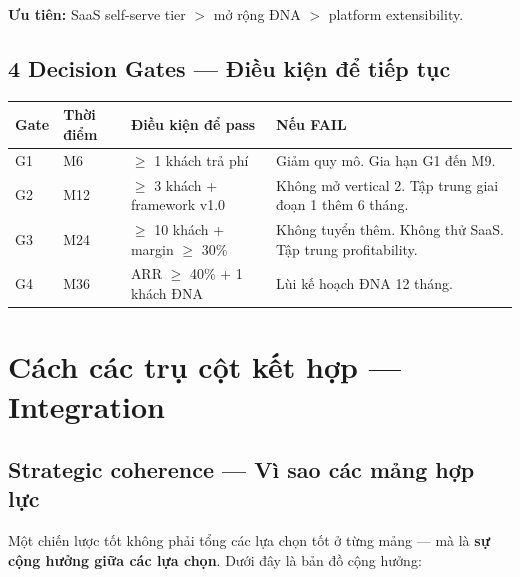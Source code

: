 \documentclass[11pt,a4paper]{article}
\begin{document}
\textbf{Ưu tiên:} SaaS self-serve tier $>$ mở rộng ĐNA $>$ platform extensibility.

\subsection{4 Decision Gates --- Điều kiện để tiếp tục}

\begin{tabularx}{\linewidth}{@{}p{1cm} p{2cm} X X@{}}
\toprule
\textbf{Gate} & \textbf{Thời điểm} & \textbf{Điều kiện để pass} & \textbf{Nếu FAIL} \\
\midrule
G1 & M6 & $\geq$ 1 khách trả phí & Giảm quy mô. Gia hạn G1 đến M9. \\
G2 & M12 & $\geq$ 3 khách + framework v1.0 & Không mở vertical 2. Tập trung giai đoạn 1 thêm 6 tháng. \\
G3 & M24 & $\geq$ 10 khách + margin $\geq$ 30\% & Không tuyển thêm. Không thử SaaS. Tập trung profitability. \\
G4 & M36 & ARR $\geq$ 40\% + 1 khách ĐNA & Lùi kế hoạch ĐNA 12 tháng. \\
\bottomrule
\end{tabularx}

\clearpage

\section{Cách các trụ cột kết hợp --- Integration}

\subsection{Strategic coherence --- Vì sao các mảng hợp lực}

Một chiến lược tốt không phải tổng các lựa chọn tốt ở từng mảng --- mà là
\textbf{sự cộng hưởng giữa các lựa chọn}. Dưới đây là bản đồ cộng hưởng:
\end{document}
